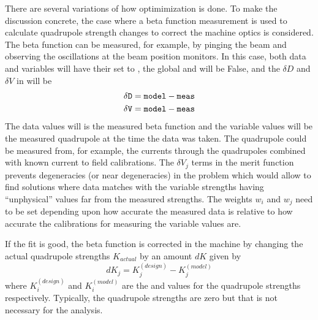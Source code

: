 {{{There are several variations of how optimimization is done. To make the discussion concrete, the
case where a beta function measurement is used to calculate quadrupole  strength changes to correct
the machine optics is considered. The beta function can be measured, for example, by pinging the
beam and observing the oscillations at the beam position monitors. In this case, both data and
variables will have their  set to , the global  and
 will be False, and the $\delta D$ and $\delta V$ in  will be
\begin{align}
  \delta &\tv{D} = \tv{model} - \tv{meas} \CRNO
  \delta &\tv{V} = \tv{model} - \tv{meas}
  \label{dd1}
\end{align}
The data  values will is the measured beta function and the variable  values will
be the measured quadrupole  at the time the data was taken. The quadrupole  could be
measured from, for example, the currents through the quadrupoles combined with known current to
field calibrations. The $\delta V_j$ terms in the merit function prevents degeneracies (or near
degeneracies) in the problem which would allow \tao to find solutions where data  matches
 with the variable  strengths having ``unphysical'' values far from the measured
strengths. The weights $w_i$ and $w_j$ need to be set depending upon how accurate the measured data
is relative to how accurate the calibrations for measuring the variable  values are.

If the fit is good, the beta function is corrected in the machine by changing the actual
quadrupole strengths $K_{actual}$ by an amount $dK$ given by
\begin{equation}
  dK_{j} = K_{j}^{(design)} - K_{j}^{(model)}
  \label{dkkk}
\end{equation}
where $K_{i}^{(design)}$ and $K_{i}^{(model)}$ are the  and  values for the
quadrupole strengths respectively. Typically, the  quadrupole strengths are zero but that is
not necessary for the analysis.

}}}
